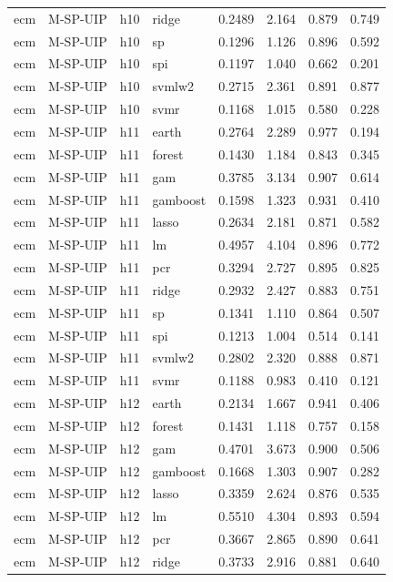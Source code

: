 \begin{ThreePartTable}
\begin{longtable}[t]{llclcccc}
ecm & M-SP-UIP & h10 & ridge & 0.2489 & 2.164 & 0.879 & 0.749\\
ecm & M-SP-UIP & h10 & sp & 0.1296 & 1.126 & 0.896 & 0.592\\
ecm & M-SP-UIP & h10 & spi & 0.1197 & 1.040 & 0.662 & 0.201\\
ecm & M-SP-UIP & h10 & svmlw2 & 0.2715 & 2.361 & 0.891 & 0.877\\
ecm & M-SP-UIP & h10 & svmr & 0.1168 & 1.015 & 0.580 & 0.228\\
\addlinespace
ecm & M-SP-UIP & h11 & earth & 0.2764 & 2.289 & 0.977 & 0.194\\
ecm & M-SP-UIP & h11 & forest & 0.1430 & 1.184 & 0.843 & 0.345\\
ecm & M-SP-UIP & h11 & gam & 0.3785 & 3.134 & 0.907 & 0.614\\
ecm & M-SP-UIP & h11 & gamboost & 0.1598 & 1.323 & 0.931 & 0.410\\
ecm & M-SP-UIP & h11 & lasso & 0.2634 & 2.181 & 0.871 & 0.582\\
ecm & M-SP-UIP & h11 & lm & 0.4957 & 4.104 & 0.896 & 0.772\\
ecm & M-SP-UIP & h11 & pcr & 0.3294 & 2.727 & 0.895 & 0.825\\
ecm & M-SP-UIP & h11 & ridge & 0.2932 & 2.427 & 0.883 & 0.751\\
ecm & M-SP-UIP & h11 & sp & 0.1341 & 1.110 & 0.864 & 0.507\\
ecm & M-SP-UIP & h11 & spi & 0.1213 & 1.004 & 0.514 & 0.141\\
ecm & M-SP-UIP & h11 & svmlw2 & 0.2802 & 2.320 & 0.888 & 0.871\\
ecm & M-SP-UIP & h11 & svmr & 0.1188 & 0.983 & 0.410 & 0.121\\
\addlinespace
ecm & M-SP-UIP & h12 & earth & 0.2134 & 1.667 & 0.941 & 0.406\\
ecm & M-SP-UIP & h12 & forest & 0.1431 & 1.118 & 0.757 & 0.158\\
ecm & M-SP-UIP & h12 & gam & 0.4701 & 3.673 & 0.900 & 0.506\\
ecm & M-SP-UIP & h12 & gamboost & 0.1668 & 1.303 & 0.907 & 0.282\\
ecm & M-SP-UIP & h12 & lasso & 0.3359 & 2.624 & 0.876 & 0.535\\
ecm & M-SP-UIP & h12 & lm & 0.5510 & 4.304 & 0.893 & 0.594\\
ecm & M-SP-UIP & h12 & pcr & 0.3667 & 2.865 & 0.890 & 0.641\\
ecm & M-SP-UIP & h12 & ridge & 0.3733 & 2.916 & 0.881 & 0.640\\

\end{longtable}
\end{ThreePartTable}
